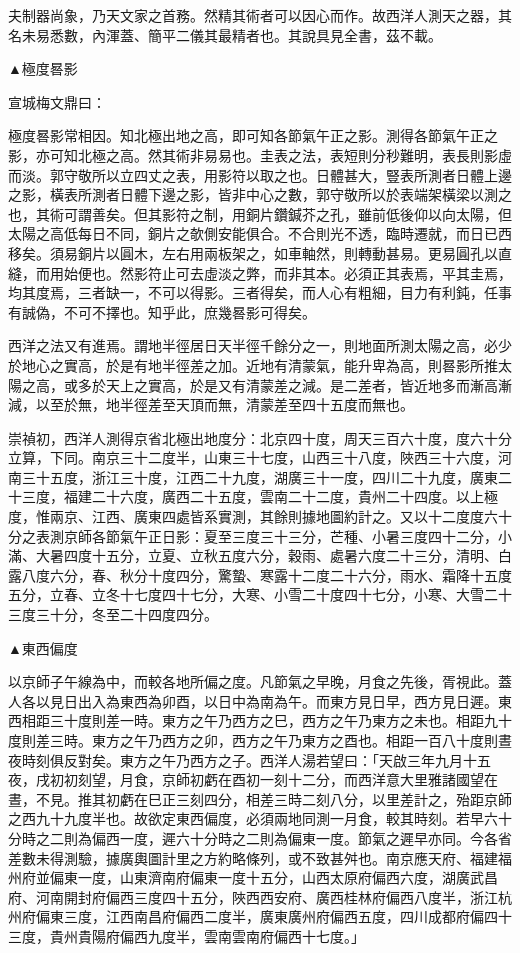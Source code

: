 \begin{pinyinscope}
夫制器尚象，乃天文家之首務。然精其術者可以因心而作。故西洋人測天之器，其名未易悉數，內渾蓋、簡平二儀其最精者也。其說具見全書，茲不載。

▲極度晷影

宣城梅文鼎曰：

極度晷影常相因。知北極出地之高，即可知各節氣午正之影。測得各節氣午正之影，亦可知北極之高。然其術非易易也。圭表之法，表短則分秒難明，表長則影虛而淡。郭守敬所以立四丈之表，用影符以取之也。日體甚大，豎表所測者日體上邊之影，橫表所測者日體下邊之影，皆非中心之數，郭守敬所以於表端架橫梁以測之也，其術可謂善矣。但其影符之制，用銅片鑽鍼芥之孔，雖前低後仰以向太陽，但太陽之高低每日不同，銅片之欹側安能俱合。不合則光不透，臨時遷就，而日已西移矣。須易銅片以圓木，左右用兩板架之，如車軸然，則轉動甚易。更易圓孔以直縫，而用始便也。然影符止可去虛淡之弊，而非其本。必須正其表焉，平其圭焉，均其度焉，三者缺一，不可以得影。三者得矣，而人心有粗細，目力有利鈍，任事有誠偽，不可不擇也。知乎此，庶幾晷影可得矣。

西洋之法又有進焉。謂地半徑居日天半徑千餘分之一，則地面所測太陽之高，必少於地心之實高，於是有地半徑差之加。近地有清蒙氣，能升卑為高，則晷影所推太陽之高，或多於天上之實高，於是又有清蒙差之減。是二差者，皆近地多而漸高漸減，以至於無，地半徑差至天頂而無，清蒙差至四十五度而無也。

崇禎初，西洋人測得京省北極出地度分：北京四十度，周天三百六十度，度六十分立算，下同。南京三十二度半，山東三十七度，山西三十八度，陜西三十六度，河南三十五度，浙江三十度，江西二十九度，湖廣三十一度，四川二十九度，廣東二十三度，福建二十六度，廣西二十五度，雲南二十二度，貴州二十四度。以上極度，惟兩京、江西、廣東四處皆系實測，其餘則據地圖約計之。又以十二度度六十分之表測京師各節氣午正日影：夏至三度三十三分，芒種、小暑三度四十二分，小滿、大暑四度十五分，立夏、立秋五度六分，穀雨、處暑六度二十三分，清明、白露八度六分，春、秋分十度四分，驚蟄、寒露十二度二十六分，雨水、霜降十五度五分，立春、立冬十七度四十七分，大寒、小雪二十度四十七分，小寒、大雪二十三度三十分，冬至二十四度四分。

▲東西偏度

以京師子午線為中，而較各地所偏之度。凡節氣之早晚，月食之先後，胥視此。蓋人各以見日出入為東西為卯酉，以日中為南為午。而東方見日早，西方見日遲。東西相距三十度則差一時。東方之午乃西方之巳，西方之午乃東方之未也。相距九十度則差三時。東方之午乃西方之卯，西方之午乃東方之酉也。相距一百八十度則晝夜時刻俱反對矣。東方之午乃西方之子。西洋人湯若望曰：「天啟三年九月十五夜，戌初初刻望，月食，京師初虧在酉初一刻十二分，而西洋意大里雅諸國望在晝，不見。推其初虧在巳正三刻四分，相差三時二刻八分，以里差計之，殆距京師之西九十九度半也。故欲定東西偏度，必須兩地同測一月食，較其時刻。若早六十分時之二則為偏西一度，遲六十分時之二則為偏東一度。節氣之遲早亦同。今各省差數未得測驗，據廣輿圖計里之方約略條列，或不致甚舛也。南京應天府、福建福州府並偏東一度，山東濟南府偏東一度十五分，山西太原府偏西六度，湖廣武昌府、河南開封府偏西三度四十五分，陜西西安府、廣西桂林府偏西八度半，浙江杭州府偏東三度，江西南昌府偏西二度半，廣東廣州府偏西五度，四川成都府偏四十三度，貴州貴陽府偏西九度半，雲南雲南府偏西十七度。」


\end{pinyinscope}
